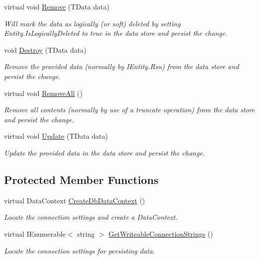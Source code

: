 \begin{DoxyCompactItemize}
virtual void \hyperlink{classCqrs_1_1DataStores_1_1SqlDataStore_a898d15db199f054865a96ac646bf54fb}{Remove} (T\+Data data)
\begin{DoxyCompactList}\small\item\em Will mark the {\itshape data}  as logically (or soft) deleted by setting Entity.\+Is\+Logically\+Deleted to true in the data store and persist the change. \end{DoxyCompactList}\item 
void \hyperlink{classCqrs_1_1DataStores_1_1SqlDataStore_a5ec396c9eb202c8de931c1546c721ca3}{Destroy} (T\+Data data)
\begin{DoxyCompactList}\small\item\em Remove the provided {\itshape data}  (normally by I\+Entity.\+Rsn) from the data store and persist the change. \end{DoxyCompactList}\item 
virtual void \hyperlink{classCqrs_1_1DataStores_1_1SqlDataStore_abb88337dccf3d5372f6b0920d5d26ebd}{Remove\+All} ()
\begin{DoxyCompactList}\small\item\em Remove all contents (normally by use of a truncate operation) from the data store and persist the change. \end{DoxyCompactList}\item 
virtual void \hyperlink{classCqrs_1_1DataStores_1_1SqlDataStore_a8f85191cecef92d003620d4064584bb2}{Update} (T\+Data data)
\begin{DoxyCompactList}\small\item\em Update the provided {\itshape data}  in the data store and persist the change. \end{DoxyCompactList}\end{DoxyCompactItemize}
\subsection*{Protected Member Functions}
\begin{DoxyCompactItemize}
\item 
virtual Data\+Context \hyperlink{classCqrs_1_1DataStores_1_1SqlDataStore_a8458af970314deef8eff6a4783b1c46f}{Create\+Db\+Data\+Context} ()
\begin{DoxyCompactList}\small\item\em Locate the connection settings and create a Data\+Context. \end{DoxyCompactList}\item 
virtual I\+Enumerable$<$ string $>$ \hyperlink{classCqrs_1_1DataStores_1_1SqlDataStore_a091f7762de79cb2d488c2baafbb71476}{Get\+Writeable\+Connection\+Strings} ()
\begin{DoxyCompactList}\small\item\em Locate the connection settings for persisting data. \end{DoxyCompactList}\end{DoxyCompactItemize}
